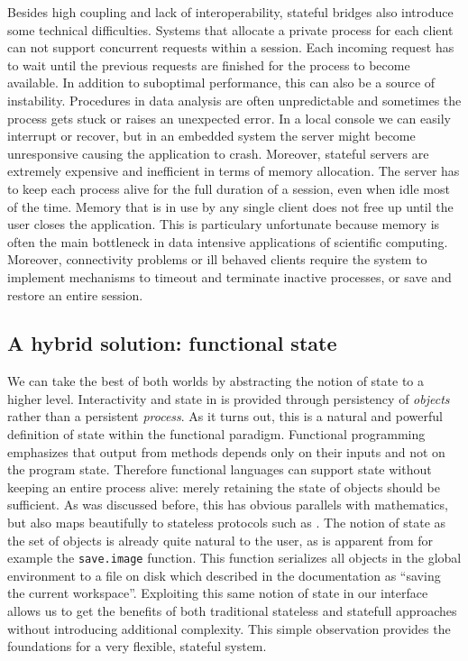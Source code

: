 Besides high coupling and lack of interoperability, stateful bridges also introduce some technical difficulties. Systems that allocate a private \R process for each client can not support concurrent requests within a session. Each incoming request has to wait until the previous requests are finished for the process to become available. In addition to suboptimal performance, this can also be a source of instability. Procedures in data analysis are often unpredictable and sometimes the \R process gets stuck or raises an unexpected error. In a local console we can easily interrupt or recover, but in an embedded system the server might become unresponsive causing the application to crash. Moreover, stateful servers are extremely expensive and inefficient in terms of memory allocation. The server has to keep each \R process alive for the full duration of a session, even when idle most of the time. Memory that is in use by any single client does not free up until the user closes the application. This is particulary unfortunate because memory is often the main bottleneck in data intensive applications of scientific computing. Moreover, connectivity problems or ill behaved clients require the system to implement mechanisms to timeout and terminate inactive processes, or save and restore an entire session.

\subsection{A hybrid solution: functional state}

We can take the best of both worlds by abstracting the notion of state to a higher level. Interactivity and state in \OpenCPU is provided through persistency of \emph{objects} rather than a persistent \emph{process}. As it turns out, this is a natural and powerful definition of state within the functional paradigm. Functional programming emphasizes that output from methods depends only on their inputs and not on the program state. Therefore functional languages can support state without keeping an entire process alive: merely retaining the state of objects should be sufficient. As was discussed before, this has obvious parallels with mathematics, but also maps beautifully to stateless protocols such as \HTTP. The notion of state as the set of objects is already quite natural to the \R user, as is apparent from for example the \texttt{save.image} function. This function serializes all objects in the global environment to a file on disk which described in the documentation as ``saving the current workspace''. Exploiting this same notion of state in our interface allows us to get the benefits of both traditional stateless and statefull approaches without introducing additional complexity. This simple observation provides the foundations for a very flexible, stateful \RPC system.

